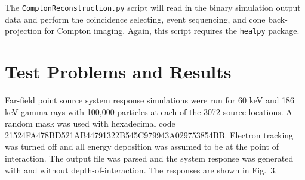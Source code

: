 \documentclass[10pt]{article}
\begin{document}
The \verb!ComptonReconstruction.py! script will read in the binary simulation output data and perform the coincidence selecting, event sequencing, and cone back-projection for Compton imaging. Again, this script requires the \verb!healpy! package.



\section{Test Problems and Results}

Far-field point source system response simulations were run for 60 keV and 186 keV gamma-rays with 100,000 particles at each of the 3072 source locations. A random mask was used with hexadecimal code 21524FA478BD521AB44791322B545C979943A029753854BB. Electron tracking was turned off and all energy deposition was assumed to be at the point of interaction. The output file was parsed and the system response was generated with and without depth-of-interaction. The responses are shown in Fig.~3.
\end{document}
